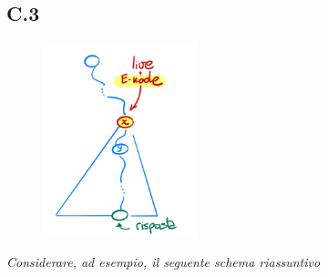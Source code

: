 \documentclass[a4paper]{article}
\begin{document}
\subsection{C.3}
\label{SEC:C3}
\begin{figure}[!ht]
\centering
\includegraphics[width=0.4\textwidth]{./img/C3.png}
\end{figure}
\emph{Considerare, ad esempio, il seguente schema riassuntivo}
\end{document}
